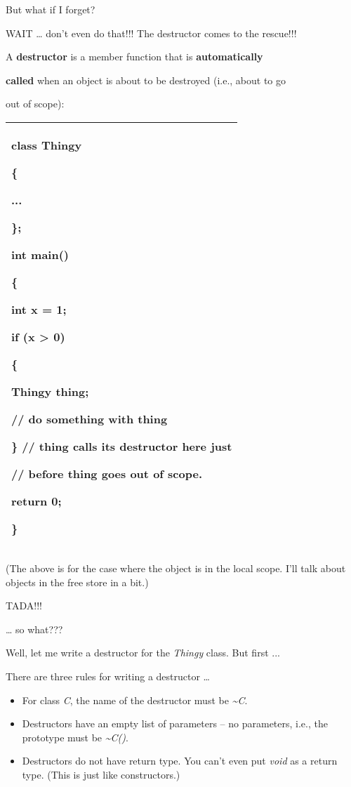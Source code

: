 \documentclass[
]{article}
\providecommand{\tightlist}{%
  \setlength{\itemsep}{0pt}\setlength{\parskip}{0pt}}
\begin{document}
But what if I forget?

WAIT \ldots{} don't even do that!!! The destructor comes to the
rescue!!!

A \textbf{destructor} is a member function that is
\textbf{automatically}

\textbf{called} when an object is about to be destroyed (i.e., about to
go

out of scope):

\begin{longtable}[]{@{}l@{}}
\toprule
\endhead
\begin{minipage}[t]{0.97\columnwidth}\raggedright
class Thingy

\{

...

\};

int main()

\{

int x = 1;

if (x \textgreater{} 0)

\{

Thingy thing;

// do something with thing

\} // thing calls its destructor here just

// before thing goes out of scope.

return 0;

\}\strut
\end{minipage}\tabularnewline
\bottomrule
\end{longtable}

(The above is for the case where the object is in the local scope. I'll
talk about objects in the free store in a bit.)

TADA!!!

\ldots{} so what???

Well, let me write a destructor for the \emph{Thingy} class. But first
...

There are three rules for writing a destructor \ldots{}

\begin{itemize}
\tightlist
\item
  For class \emph{C}, the name of the destructor must be
  \emph{\textasciitilde C}.
\item
  Destructors have an empty list of parameters -- no parameters, i.e.,
  the prototype must be \emph{\textasciitilde C()}.
\item
  Destructors do not have return type. You can't even put \emph{void} as
  a return type. (This is just like constructors.)
\end{itemize}
\end{document}
